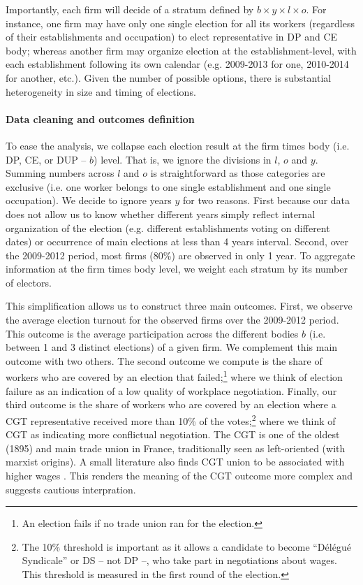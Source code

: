 Importantly, each firm will decide of a stratum defined by $b \times y \times l \times o$. For instance, one firm may have only one single election for all its workers (regardless of their establishments and occupation) to elect representative in DP and CE body; whereas another firm may organize election at the establishment-level, with each establishment following its own calendar (e.g. 2009-2013 for one, 2010-2014 for another, etc.). Given the number of possible options, there is substantial heterogeneity in size and timing of elections.

\paragraph{Data cleaning and outcomes definition} To ease the analysis, we collapse each election result at the firm times body (i.e. DP, CE, or DUP -- $b$) level. That is, we ignore the divisions in $l$, $o$ and $y$. Summing numbers across $l$ and $o$ is straightforward as those categories are exclusive (i.e. one worker belongs to one single establishment  and one single occupation). We decide to ignore years $y$ for two reasons. First because our data does not allow us to know whether different years simply reflect internal organization of the election (e.g. different establishments voting on different dates) or occurrence of main elections at less than 4 years interval. Second, over the 2009-2012 period, most firms (80\%) are observed in only 1 year. To aggregate information at the firm times body level, we weight each stratum by its number of electors. 

This simplification allows us to construct three main outcomes. First, we observe the average election turnout for the observed firms over the 2009-2012 period. This outcome is the average participation across the different bodies $b$ (i.e. between 1 and 3 distinct elections) of a given firm. We complement this main outcome with two others. The second outcome we compute is the share of workers who are covered by an election that failed;\footnote{An election fails if no trade union ran for the election.} where we think of election failure as an indication of a low quality of workplace negotiation. Finally, our third outcome is the share of workers who are covered by an election where a CGT representative received more than 10\% of the votes;\footnote{The 10\% threshold is important as it allows a candidate to become ``Délégué Syndicale'' or DS -- not DP --, who take part in negotiations about wages. This threshold is measured in the first round of the election.} where we think of CGT as indicating more conflictual negotiation. The CGT is one of the oldest (1895) and main trade union in France, traditionally seen as left-oriented (with marxist origins). A small literature also finds CGT union to be associated with higher wages \citep{abowd_persistent_2012, breda_firms_2015}. This renders the meaning of the CGT outcome more complex and suggests cautious interpration.

